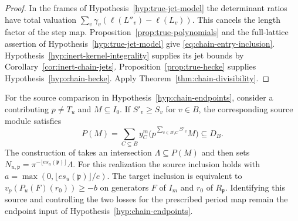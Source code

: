 \begin{proof}
In the frames of Hypothesis~\ref{hyp:true-jet-model} the determinant
ratios have total valuation $\sum_v\gamma_v(\ell(L''_v)-\ell(L_v))$.
This cancels the length factor of the step map. Proposition~\ref{prop:true-polynomials}
and the full-lattice assertion of Hypothesis~\ref{hyp:true-jet-model}
give \eqref{eq:chain-entry-inclusion}. Hypothesis~\ref{hyp:inert-kernel-integrality}
supplies its jet bounds by Corollary~\ref{cor:inert-chain-jets}.
Proposition~\ref{prop:true-hecke} supplies Hypothesis~\ref{hyp:chain-hecke}.
Apply Theorem~\ref{thm:chain-divisibility}.
\end{proof}

For the source comparison in Hypothesis~\ref{hyp:chain-endpoints},
consider a contributing $p\ne T_u$ and $M\subseteq I_0$. If
$S'_v\ge S_v$ for $v\in B$, the corresponding source module satisfies
\[
 P(M)=\sum_{C\subseteq B}y_C^m
        \bigl(p^{\sum_{v\in B\setminus C}S'_v}M\bigr)\subseteq D_B .
\]
The construction of \citep[Theorem~12.18 and Definition~12.20]{adriazola-grh}
takes an intersection $\Lambda\subseteq P(M)$ and then sets
$N_{u,\mathfrak p}=\pi^{-\lfloor e s_u(\mathfrak p)\rfloor}\Lambda$.
For this realization the source inclusion holds with
$a=\max(0,\lfloor e s_u(\mathfrak p)\rfloor/e)$.
The target inclusion is equivalent to
$v_p(P_u(F)(r_0))\ge-b$ on generators $F$ of $I_m$ and $r_0$ of
$R_{\mathfrak p}$. Identifying this source and controlling the two
losses for the prescribed period map remain the endpoint input
of Hypothesis~\ref{hyp:chain-endpoints}.

